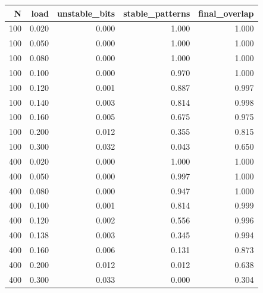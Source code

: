 \begin{tabular}{rrrrr}
\toprule
N & load & unstable\_bits & stable\_patterns & final\_overlap \\
\midrule
100 & 0.020 & 0.000 & 1.000 & 1.000 \\
100 & 0.050 & 0.000 & 1.000 & 1.000 \\
100 & 0.080 & 0.000 & 1.000 & 1.000 \\
100 & 0.100 & 0.000 & 0.970 & 1.000 \\
100 & 0.120 & 0.001 & 0.887 & 0.997 \\
100 & 0.140 & 0.003 & 0.814 & 0.998 \\
100 & 0.160 & 0.005 & 0.675 & 0.975 \\
100 & 0.200 & 0.012 & 0.355 & 0.815 \\
100 & 0.300 & 0.032 & 0.043 & 0.650 \\
400 & 0.020 & 0.000 & 1.000 & 1.000 \\
400 & 0.050 & 0.000 & 0.997 & 1.000 \\
400 & 0.080 & 0.000 & 0.947 & 1.000 \\
400 & 0.100 & 0.001 & 0.814 & 0.999 \\
400 & 0.120 & 0.002 & 0.556 & 0.996 \\
400 & 0.138 & 0.003 & 0.345 & 0.994 \\
400 & 0.160 & 0.006 & 0.131 & 0.873 \\
400 & 0.200 & 0.012 & 0.012 & 0.638 \\
400 & 0.300 & 0.033 & 0.000 & 0.304 \\
\bottomrule
\end{tabular}
